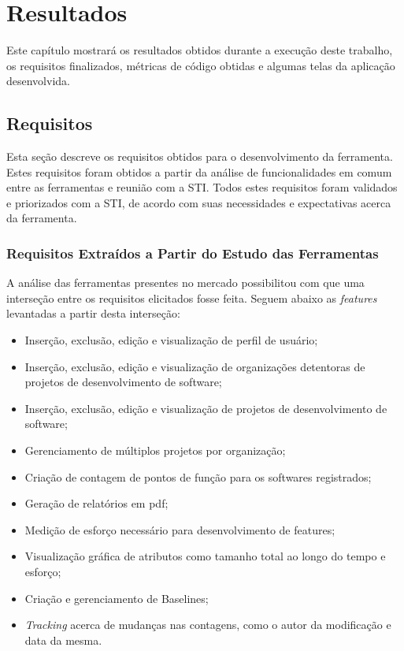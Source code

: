 \chapter[Resultados]{Resultados}

Este capítulo mostrará os resultados obtidos durante a execução deste trabalho, os requisitos finalizados, métricas de código obtidas e algumas telas da aplicação desenvolvida.


\section{Requisitos}

Esta seção descreve os requisitos obtidos para o desenvolvimento da ferramenta. Estes requisitos foram obtidos a partir da análise de funcionalidades em comum entre as ferramentas e reunião com a STI. Todos estes requisitos foram validados e priorizados com a STI, de acordo com suas necessidades e expectativas acerca da ferramenta.

\subsection{Requisitos Extraídos a Partir do Estudo das Ferramentas}

A análise das ferramentas presentes no mercado possibilitou com que uma interseção entre os requisitos elicitados fosse feita. Seguem abaixo as \textit{features} levantadas a partir desta interseção:

\begin{itemize}

\item Inserção, exclusão, edição e visualização de perfil de usuário;

\item Inserção, exclusão, edição e visualização de organizações detentoras de
projetos de desenvolvimento de software;

\item Inserção, exclusão, edição e visualização de projetos de desenvolvimento de software;

\item Gerenciamento de múltiplos projetos por organização;

\item Criação de contagem de pontos de função para os softwares registrados;

\item Geração de relatórios em pdf;

\item Medição de esforço necessário para desenvolvimento de features;

\item Visualização gráfica de atributos como tamanho total ao longo do tempo e
esforço;

\item Criação e gerenciamento de Baselines;

\item \textit{Tracking} acerca de mudanças nas contagens, como o autor da modificação e data da mesma.

\end{itemize}

